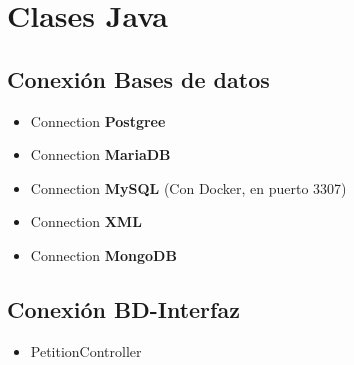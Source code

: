 \documentclass[12pt,a4paper]{article}
\begin{document}
\section{Clases Java} \label{pto6} 


\subsection{Conexión Bases de datos} \label{pto61}

\begin{itemize}

\item Connection \textbf{Postgree} \label{pto611}

 
 \item Connection \textbf{MariaDB} \label{pto612}


\item Connection \textbf{MySQL} (Con Docker, en puerto 3307) \label{pto613}


\item Connection \textbf{XML} \label{pto614}


\item Connection \textbf{MongoDB} \label{pto615}

\end{itemize}
\subsection{Conexión BD-Interfaz} \label{pto62}
\begin{itemize}
\item PetitionController \label{pto621}

\end{itemize}







\newpage
\mbox{}
\newpage
\end{document}
